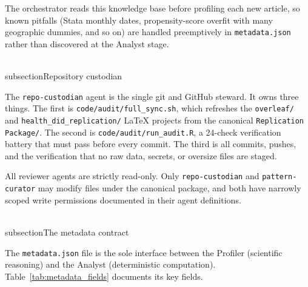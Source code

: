 The orchestrator reads this knowledge base before profiling each new article, so known pitfalls (Stata monthly dates, propensity-score overfit with many geographic dummies, and so on) are handled preemptively in \texttt{metadata.json} rather than discovered at the Analyst stage.


\\subsection{Repository custodian}
\label{sec:appc_custodian}

The \texttt{repo-custodian} agent is the single git and GitHub steward. It owns three things. The first is \texttt{code/audit/full\_sync.sh}, which refreshes the \texttt{overleaf/} and \texttt{health\_did\_replication/} LaTeX projects from the canonical \texttt{Replication Package/}. The second is \texttt{code/audit/run\_audit.R}, a 24-check verification battery that must pass before every commit. The third is all commits, pushes, and the verification that no raw data, secrets, or oversize files are staged.

All reviewer agents are strictly read-only. Only \texttt{repo-custodian} and \texttt{pattern-curator} may modify files under the canonical package, and both have narrowly scoped write permissions documented in their agent definitions.


\\subsection{The metadata contract}
\label{sec:appc_metadata}

The \texttt{metadata.json} file is the sole interface between the Profiler (scientific reasoning) and the Analyst (deterministic computation). Table~\ref{tab:metadata_fields} documents its key fields.

